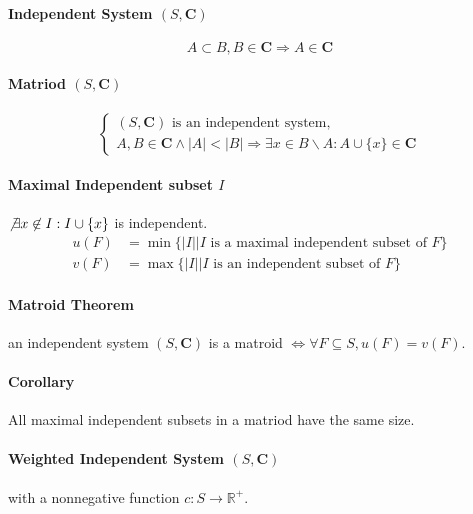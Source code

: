 \documentclass[a4paper]{article}
\begin{document}
\begin{multicols}{2}

\begin{tcolorbox}[title=Matroid]
\paragraph{Independent System $(S,\mathbf{C})$} $$A\subset B, B\in \mathbf{C}\Rightarrow A\in \mathbf{C}$$
\paragraph{Matriod $(S,\mathbf{C})$}$$\begin{cases}
    (S,\mathbf{C})\text{ is an independent system,}\\
    A,B\in \mathbf{C} \land |A|<|B|\Rightarrow \exists x\in B\backslash A: A\cup \{x\}\in \mathbf{C}
\end{cases}$$ 
\paragraph{Maximal Independent subset $I$} $\not\exists x\not\in I: I\cup \{x\}$ is independent.
\begin{align*}
    u(F) &=\min\{|I||I\text{ is a maximal independent subset of }F\}\\
    v(F) &=\max\{|I||I\text{ is an independent subset of }F\}
\end{align*}
\paragraph{Matroid Theorem} an independent system $(S,\mathbf{C})$ is a matroid $\Leftrightarrow \forall F\subseteq S, u(F)=v(F)$.
\paragraph{Corollary} All maximal independent subsets in a matriod have the same size. 
\paragraph{Weighted Independent System $(S,\mathbf{C})$} with a nonnegative function $c:S\rightarrow \mathbb{R}^+$.
\end{tcolorbox}


\end{multicols}
\end{document}
